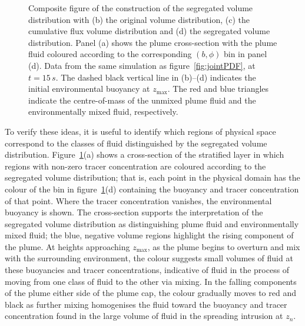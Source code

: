 \documentclass[a4paper]{article}
\begin{document}
\begin{figure}
	\centering
	\caption{Composite figure of the construction of the segregated volume distribution with (b) the original
	volume distribution, (c) the cumulative flux volume distribution and (d) the segregated volume
	distribution. Panel (a) shows the plume cross-section with the plume fluid coloured according to the
	corresponding $(b, \phi)$ bin in panel (d).  Data from the same simulation as figure~\ref{fig:jointPDF},
	at $t = 15\, s$.  The dashed black vertical line in (b)--(d) indicates the initial environmental buoyancy
	at $z_{\max}$. The red and blue triangles indicate the centre-of-mass of the unmixed plume fluid and the
	environmentally mixed fluid, respectively.}
	\label{fig:modPDF}
\end{figure}

To verify these ideas, it is useful to identify which regions of physical space correspond to
the classes of fluid distinguished by the segregated volume distribution. Figure~\ref{fig:modPDF}(a) shows a
cross-section of the stratified layer in which regions with non-zero tracer concentration are coloured
according to the segregated volume distribution; that is, each point in the physical domain has the colour of
the bin in figure~\ref{fig:modPDF}(d) containing the buoyancy and tracer concentration of that point. Where
the tracer concentration vanishes, the environmental buoyancy is shown. The cross-section supports the
interpretation of the segregated volume distribution as distinguishing plume fluid and environmentally mixed
fluid; the blue, negative volume regions highlight the rising component of the plume. At heights approaching
$z_{\max}$, as the plume begins to overturn and mix with the surrounding environment, the colour suggests
small volumes of fluid at these buoyancies and tracer concentrations, indicative of fluid in the process of
moving from one class of fluid to the other via mixing. In the falling components of the plume either side of
the plume cap, the colour gradually moves to red and black as further mixing homogenises the fluid toward the
buoyancy and tracer concentration found in the large volume of fluid in the spreading intrusion at $z_n$.  
\end{document}
